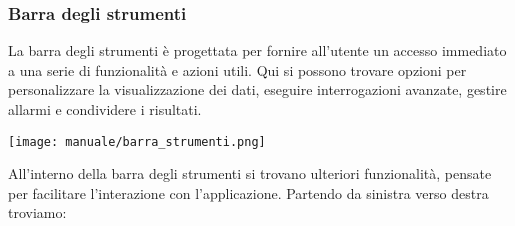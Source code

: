 \subsubsection{Barra degli strumenti}
La barra degli strumenti è progettata per fornire all'utente un accesso immediato a una serie di funzionalità e azioni utili. Qui si possono trovare opzioni per personalizzare la visualizzazione dei dati, eseguire interrogazioni avanzate, gestire allarmi e condividere i risultati.
\begin{center}
    \texttt{[image: manuale/barra\_strumenti.png]}
\end{center}
All'interno della barra degli strumenti si trovano ulteriori funzionalità, pensate per facilitare l'interazione con l'applicazione. Partendo da sinistra verso destra troviamo:
